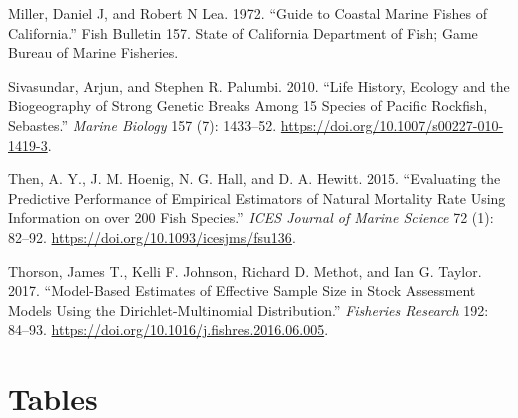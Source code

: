 \documentclass[11pt,
  english,
  a4paper,
]{article}
\begin{document}
\begin{cslreferences}
\leavevmode\hypertarget{ref-miller_guide_1972}{}%
Miller, Daniel J, and Robert N Lea. 1972. ``Guide to Coastal Marine Fishes of California.'' Fish Bulletin 157. State of California Department of Fish; Game Bureau of Marine Fisheries.

\leavevmode\hypertarget{ref-sivasundar_life_2010}{}%
Sivasundar, Arjun, and Stephen R. Palumbi. 2010. ``Life History, Ecology and the Biogeography of Strong Genetic Breaks Among 15 Species of Pacific Rockfish, Sebastes.'' \emph{Marine Biology} 157 (7): 1433--52. \url{https://doi.org/10.1007/s00227-010-1419-3}.

\leavevmode\hypertarget{ref-then_evaluating_2015}{}%
Then, A. Y., J. M. Hoenig, N. G. Hall, and D. A. Hewitt. 2015. ``Evaluating the Predictive Performance of Empirical Estimators of Natural Mortality Rate Using Information on over 200 Fish Species.'' \emph{ICES Journal of Marine Science} 72 (1): 82--92. \url{https://doi.org/10.1093/icesjms/fsu136}.

\leavevmode\hypertarget{ref-thorson_model-based_2017}{}%
Thorson, James T., Kelli F. Johnson, Richard D. Methot, and Ian G. Taylor. 2017. ``Model-Based Estimates of Effective Sample Size in Stock Assessment Models Using the Dirichlet-Multinomial Distribution.'' \emph{Fisheries Research} 192: 84--93. \url{https://doi.org/10.1016/j.fishres.2016.06.005}.
\end{cslreferences}

\leavevmode\tagmcend\tagstructend

\clearpage


\hypertarget{tables}{%
\section{Tables}\label{tables}}

\leavevmode\tagmcend\tagstructend



\newpage

\begingroup\fontsize{10}{12}\selectfont
\begingroup\fontsize{10}{12}\selectfont
\end{document}
